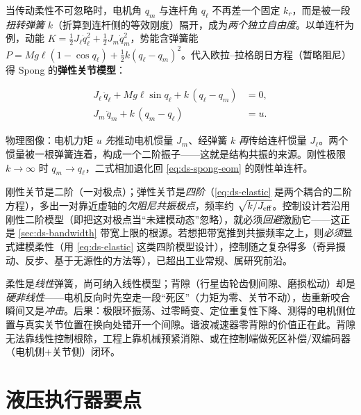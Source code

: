 当传动柔性不可忽略时，电机角 $q_m$ 与连杆角 $q_\ell$ 不再差一个固定 $k_r$，而是被一段\emph{扭转弹簧} $k$（折算到连杆侧的等效刚度）隔开，成为\emph{两个独立自由度}。以单连杆为例，动能 $K=\tfrac12 J_\ell\dot q_\ell^2+\tfrac12 J_m\dot q_m^2$，势能含弹簧能 $P=Mg\ell(1-\cos q_\ell)+\tfrac12 k(q_\ell-q_m)^2$。代入欧拉--拉格朗日方程（暂略阻尼）得 Spong 的\textbf{弹性关节模型}\cite{spong1987flexible}：

\begin{equation}
\boxed{
\begin{aligned}
J_\ell\,\ddot q_\ell + Mg\ell\sin q_\ell + k\,(q_\ell-q_m) &= 0,\\
J_m\,\ddot q_m + k\,(q_m-q_\ell) &= u.
\end{aligned}}
\label{eq:ds-elastic}
\end{equation}

物理图像：电机力矩 $u$ \emph{先}推动电机惯量 $J_m$、经弹簧 $k$ \emph{再}传给连杆惯量 $J_\ell$。两个惯量被一根弹簧连着，构成一个二阶振子——这就是结构共振的来源。刚性极限 $k\to\infty$ 时 $q_m\to q_\ell$，二式相加退化回 \cref{eq:ds-spong-eom} 的刚性单连杆。

\begin{insight}
\label{ins:ds-flex-order}
刚性关节是二阶（一对极点）；弹性关节是\emph{四阶}（\cref{eq:ds-elastic} 是两个耦合的二阶方程），多出一对靠近虚轴的\emph{欠阻尼共振极点}，频率约 $\sqrt{k/J_{\rm eff}}$。控制设计若沿用刚性二阶模型（即把这对极点当“未建模动态”忽略），就必须\emph{回避}激励它——这正是 \cref{sec:ds-bandwidth} 带宽上限的根源。若想把带宽推到共振频率之上，则\emph{必须}显式建模柔性（用 \cref{eq:ds-elastic} 这类四阶模型设计），控制随之复杂得多（奇异摄动、反步、基于无源性的方法等），已超出工业常规、属研究前沿。
\end{insight}

\begin{pitfall}
柔性是\emph{线性}弹簧，尚可纳入线性模型；背隙（行星齿轮齿侧间隙、磨损松动）却是\emph{硬非线性}——电机反向时先空走一段“死区”（力矩为零、关节不动），齿重新咬合瞬间又是\emph{冲击}。后果：极限环振荡、过零畸变、定位重复性下降、测得的电机侧位置与真实关节位置在换向处错开一个间隙。谐波减速器零背隙的价值正在此。背隙无法靠线性控制根除，工程上靠机械预紧消隙、或在控制端做死区补偿/双编码器（电机侧$+$关节侧）闭环。
\end{pitfall}

\section{液压执行器要点}
\label{sec:ds-hydraulic}

